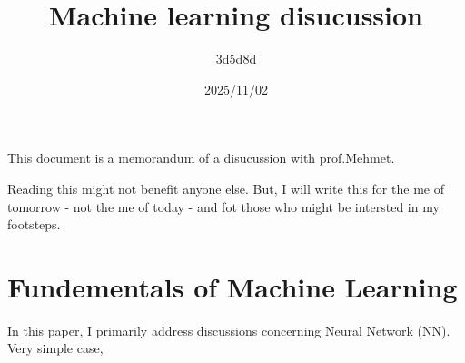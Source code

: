 \documentclass{ltjsarticle}      %
\title{Machine learning disucussion}
\author{3d5d8d}
\date{2025/11/02}
\begin{document}
\maketitle

This document is a memorandum of a disucussion with prof.Mehmet.\par
Reading this might not benefit anyone else.
But, I will write this for the me of tomorrow - not the me of today - and fot those who might be intersted in my footsteps.\par

\section{Fundementals of Machine Learning}
In this paper, I primarily address discussions concerning Neural Network (NN). Very simple case, 
\end{document}
